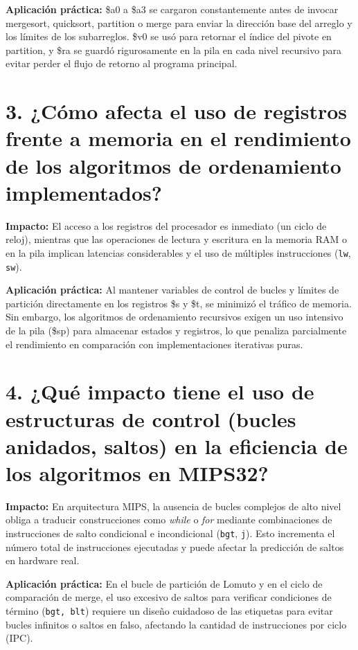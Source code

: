 \documentclass[12pt,a4paper]{article}
\begin{document}
\textbf{Aplicación práctica:} \$a0 a \$a3 se cargaron constantemente antes de invocar mergesort, quicksort, partition o merge para enviar la dirección base del arreglo y los límites de los subarreglos. \$v0 se usó para retornar el índice del pivote en partition, y \$ra se guardó rigurosamente en la pila en cada nivel recursivo para evitar perder el flujo de retorno al programa principal.

\section*{3. ¿Cómo afecta el uso de registros frente a memoria en el rendimiento de los algoritmos de ordenamiento implementados?}

\textbf{Impacto:} El acceso a los registros del procesador es inmediato (un ciclo de reloj), mientras que las operaciones de lectura y escritura en la memoria RAM o en la pila implican latencias considerables y el uso de múltiples instrucciones (\texttt{lw}, \texttt{sw}).

\textbf{Aplicación práctica:} Al mantener variables de control de bucles y límites de partición directamente en los registros \$s y \$t, se minimizó el tráfico de memoria. Sin embargo, los algoritmos de ordenamiento recursivos exigen un uso intensivo de la pila (\$sp) para almacenar estados y registros, lo que penaliza parcialmente el rendimiento en comparación con implementaciones iterativas puras.

\section*{4. ¿Qué impacto tiene el uso de estructuras de control (bucles anidados, saltos) en la eficiencia de los algoritmos en MIPS32?}

\textbf{Impacto:} En arquitectura MIPS, la ausencia de bucles complejos de alto nivel obliga a traducir construcciones como \textit{while} o \textit{for} mediante combinaciones de instrucciones de salto condicional e incondicional (\texttt{bgt}, \texttt{j}). Esto incrementa el número total de instrucciones ejecutadas y puede afectar la predicción de saltos en hardware real.

\textbf{Aplicación práctica:} En el bucle de partición de Lomuto y en el ciclo de comparación de merge, el uso excesivo de saltos para verificar condiciones de término (\texttt{bgt, blt}) requiere un diseño cuidadoso de las etiquetas para evitar bucles infinitos o saltos en falso, afectando la cantidad de instrucciones por ciclo (IPC).
\end{document}
